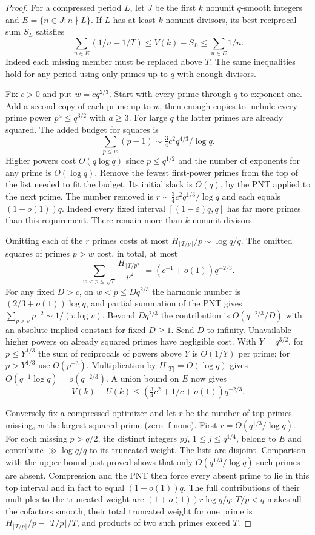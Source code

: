 \begin{proof}
For a compressed period $L$, let $J$ be the first $k$ nonunit $q$-smooth integers and $E=\{n\in J:n\nmid L\}$. If $L$ has at least $k$ nonunit divisors, its best reciprocal sum $S_L$ satisfies
\[
 \sum_{n\in E}(1/n-1/T)\le V(k)-S_L\le\sum_{n\in E}1/n.
\]
Indeed each missing member must be replaced above $T$. The same inequalities hold for any period using only primes up to $q$ with enough divisors.

Fix $c>0$ and put $w=cq^{2/3}$. Start with every prime through $q$ to exponent one. Add a second copy of each prime up to $w$, then enough copies to include every prime power $p^a\le q^{3/2}$ with $a\ge3$. For large $q$ the latter primes are already squared. The added budget for squares is
\[
 \sum_{p\le w}(p-1)\sim\tfrac34 c^2 q^{4/3}/\log q.
\]
Higher powers cost $O(q\log q)$ since $p\le q^{1/2}$ and the number of exponents for any prime is $O(\log q)$. Remove the fewest first-power primes from the top of the list needed to fit the budget. Its initial slack is $O(q)$, by the PNT applied to the next prime. The number removed is $r\sim\tfrac34 c^2 q^{1/3}/\log q$ and each equals $(1+o(1))q$. Indeed every fixed interval $[(1-\varepsilon)q,q]$ has far more primes than this requirement. There remain more than $k$ nonunit divisors.

Omitting each of the $r$ primes costs at most $H_{\lfloor T/p\rfloor}/p\sim\log q/q$. The omitted squares of primes $p>w$ cost, in total, at most
\[
 \sum_{w<p\le\sqrt T}\frac{H_{\lfloor T/p^2\rfloor}}{p^2}
   =(c^{-1}+o(1))q^{-2/3}.
\]
For any fixed $D>c$, on $w<p\le Dq^{2/3}$ the harmonic number is $(2/3+o(1))\log q$, and partial summation of the PNT gives $\sum_{p>v}p^{-2}\sim1/(v\log v)$. Beyond $Dq^{2/3}$ the contribution is $O(q^{-2/3}/D)$ with an absolute implied constant for fixed $D\ge1$. Send $D$ to infinity. Unavailable higher powers on already squared primes have negligible cost. With $Y=q^{3/2}$, for $p\le Y^{1/3}$ the sum of reciprocals of powers above $Y$ is $O(1/Y)$ per prime; for $p>Y^{1/3}$ use $O(p^{-3})$. Multiplication by $H_{\lfloor T\rfloor}=O(\log q)$ gives $O(q^{-1}\log q)=o(q^{-2/3})$. A union bound on $E$ now gives
\[
 V(k)-U(k)\le (\tfrac34 c^2+1/c+o(1))q^{-2/3}.
\]

Conversely fix a compressed optimizer and let $r$ be the number of top primes missing, $w$ the largest squared prime (zero if none). First $r=O(q^{1/3}/\log q)$. For each missing $p>q/2$, the distinct integers $pj$, $1\le j\le q^{1/4}$, belong to $E$ and contribute $\gg\log q/q$ to its truncated weight. The lists are disjoint. Comparison with the upper bound just proved shows that only $O(q^{1/3}/\log q)$ such primes are absent. Compression and the PNT then force every absent prime to lie in this top interval and in fact to equal $(1+o(1))q$. The full contributions of their multiples to the truncated weight are $(1+o(1))r\log q/q$: $T/p<q$ makes all the cofactors smooth, their total truncated weight for one prime is $H_{\lfloor T/p\rfloor}/p-\lfloor T/p\rfloor/T$, and products of two such primes exceed $T$.


\end{proof}
